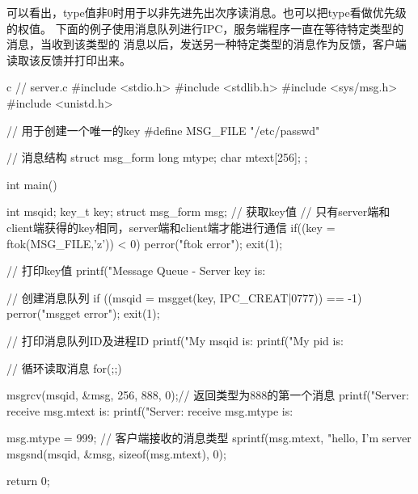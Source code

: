 可以看出，type值非0时用于以非先进先出次序读消息。也可以把type看做优先级的权值。
下面的例子使用消息队列进行IPC，服务端程序一直在等待特定类型的消息，当收到该类型的
消息以后，发送另一种特定类型的消息作为反馈，客户端读取该反馈并打印出来。
\begin{code-block}{c}
// server.c
#include <stdio.h>
#include <stdlib.h>
#include <sys/msg.h>
#include <unistd.h>

// 用于创建一个唯一的key
#define MSG_FILE "/etc/passwd"

// 消息结构
struct msg_form {
        long mtype;
        char mtext[256];
};

int main()
{
        int msqid;
        key_t key;
        struct msg_form msg;
        // 获取key值
        // 只有server端和client端获得的key相同，server端和client端才能进行通信
        if((key = ftok(MSG_FILE,'z')) < 0)
        {
                perror("ftok error");
                exit(1);
        }

        // 打印key值
        printf("Message Queue - Server key is: %

        // 创建消息队列
        if ((msqid = msgget(key, IPC_CREAT|0777)) == -1)
        {
                perror("msgget error");
                exit(1);
        }

        // 打印消息队列ID及进程ID
        printf("My msqid is: %
        printf("My pid is: %

        // 循环读取消息
        for(;;)
        {
                msgrcv(msqid, &msg, 256, 888, 0);// 返回类型为888的第一个消息
                printf("Server: receive msg.mtext is: %
                printf("Server: receive msg.mtype is: %

                msg.mtype = 999; // 客户端接收的消息类型
                sprintf(msg.mtext, "hello, I'm server %
                msgsnd(msqid, &msg, sizeof(msg.mtext), 0);
        }
        return 0;
}
\end{code-block}

